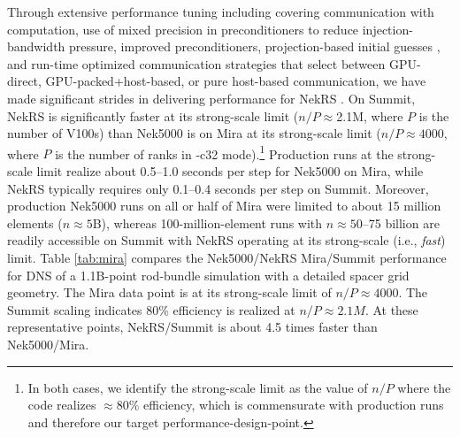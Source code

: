 Through extensive performance tuning including covering communication with
computation, use of mixed precision in preconditioners to reduce
injection-bandwidth pressure, improved preconditioners, projection-based
initial guesses \cite{fisc98}, and run-time optimized
communication strategies that select between GPU-direct, GPU-packed+host-based,
or pure host-based communication, we have made significant strides in delivering
performance for NekRS \cite{nekrs}.  On Summit, NekRS is significantly faster at
its strong-scale limit ($n/P \approx $2.1M, where $P$ is the number of V100s)
than Nek5000 is on Mira at its strong-scale limit ($n/P \approx 4000$, where $P$
is the number of ranks in -c32 mode).\footnote{In both cases, we identify the
strong-scale limit as the value of $n/P$ where the code realizes $\approx$80\%
efficiency, which is commensurate with production runs and therefore our target
performance-design-point.}  Production runs at the strong-scale limit realize
about 0.5--1.0 seconds per step for Nek5000 on Mira, while NekRS typically
requires only 0.1--0.4 seconds per step on Summit.  Moreover, production
Nek5000 runs on all or half of Mira were limited to about 15 million elements
($n \approx 5$B), whereas 100-million-element runs with $n \approx 50$--75
billion are readily accessible on Summit with NekRS operating at its
strong-scale (i.e., {\em fast}) limit.  
Table \ref{tab:mira} compares the Nek5000/NekRS Mira/Summit
performance for DNS of a 1.1B-point rod-bundle simulation with a detailed
spacer grid geometry.  The Mira data point is at its strong-scale limit
of $n/P \approx 4000$.  The Summit scaling indicates 80\%
efficiency is realized at $n/P \approx 2.1M$.  At these representative
points, NekRS/Summit is about 4.5 times faster than Nek5000/Mira. \\


